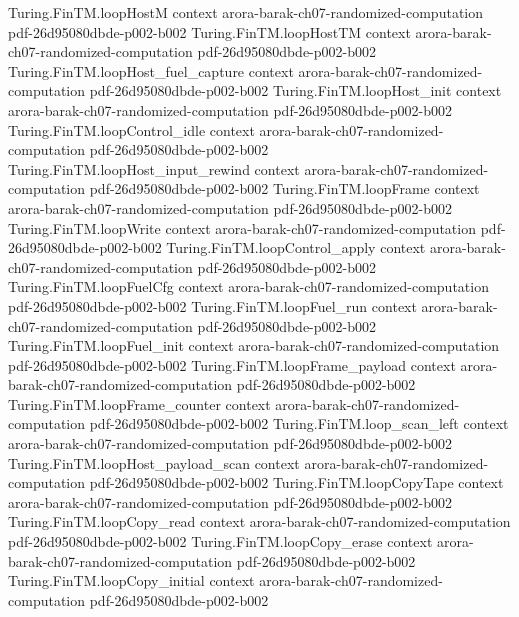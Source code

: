 \begin{theorem}
\proofstep
  {Turing.FinTM.loopHostM}
  {context}
  {arora-barak-ch07-randomized-computation}
  {pdf-26d95080dbde-p002-b002}
\proofstep
  {Turing.FinTM.loopHostTM}
  {context}
  {arora-barak-ch07-randomized-computation}
  {pdf-26d95080dbde-p002-b002}
\proofstep
  {Turing.FinTM.loopHost_fuel_capture}
  {context}
  {arora-barak-ch07-randomized-computation}
  {pdf-26d95080dbde-p002-b002}
\proofstep
  {Turing.FinTM.loopHost_init}
  {context}
  {arora-barak-ch07-randomized-computation}
  {pdf-26d95080dbde-p002-b002}
\proofstep
  {Turing.FinTM.loopControl_idle}
  {context}
  {arora-barak-ch07-randomized-computation}
  {pdf-26d95080dbde-p002-b002}
\proofstep
  {Turing.FinTM.loopHost_input_rewind}
  {context}
  {arora-barak-ch07-randomized-computation}
  {pdf-26d95080dbde-p002-b002}
\proofstep
  {Turing.FinTM.loopFrame}
  {context}
  {arora-barak-ch07-randomized-computation}
  {pdf-26d95080dbde-p002-b002}
\proofstep
  {Turing.FinTM.loopWrite}
  {context}
  {arora-barak-ch07-randomized-computation}
  {pdf-26d95080dbde-p002-b002}
\proofstep
  {Turing.FinTM.loopControl_apply}
  {context}
  {arora-barak-ch07-randomized-computation}
  {pdf-26d95080dbde-p002-b002}
\proofstep
  {Turing.FinTM.loopFuelCfg}
  {context}
  {arora-barak-ch07-randomized-computation}
  {pdf-26d95080dbde-p002-b002}
\proofstep
  {Turing.FinTM.loopFuel_run}
  {context}
  {arora-barak-ch07-randomized-computation}
  {pdf-26d95080dbde-p002-b002}
\proofstep
  {Turing.FinTM.loopFuel_init}
  {context}
  {arora-barak-ch07-randomized-computation}
  {pdf-26d95080dbde-p002-b002}
\proofstep
  {Turing.FinTM.loopFrame_payload}
  {context}
  {arora-barak-ch07-randomized-computation}
  {pdf-26d95080dbde-p002-b002}
\proofstep
  {Turing.FinTM.loopFrame_counter}
  {context}
  {arora-barak-ch07-randomized-computation}
  {pdf-26d95080dbde-p002-b002}
\proofstep
  {Turing.FinTM.loop_scan_left}
  {context}
  {arora-barak-ch07-randomized-computation}
  {pdf-26d95080dbde-p002-b002}
\proofstep
  {Turing.FinTM.loopHost_payload_scan}
  {context}
  {arora-barak-ch07-randomized-computation}
  {pdf-26d95080dbde-p002-b002}
\proofstep
  {Turing.FinTM.loopCopyTape}
  {context}
  {arora-barak-ch07-randomized-computation}
  {pdf-26d95080dbde-p002-b002}
\proofstep
  {Turing.FinTM.loopCopy_read}
  {context}
  {arora-barak-ch07-randomized-computation}
  {pdf-26d95080dbde-p002-b002}
\proofstep
  {Turing.FinTM.loopCopy_erase}
  {context}
  {arora-barak-ch07-randomized-computation}
  {pdf-26d95080dbde-p002-b002}
\proofstep
  {Turing.FinTM.loopCopy_initial}
  {context}
  {arora-barak-ch07-randomized-computation}
  {pdf-26d95080dbde-p002-b002}

\end{theorem}
